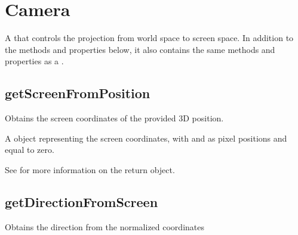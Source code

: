 \documentclass[letterpaper,12pt,english,openany,oneside]{sphinxmanual}
\begin{document}
\label{\detokenize{JS_3D_API:properties-2}}


\section{Camera}
\label{\detokenize{JS_3D_API:camera}}
A  that controls the projection from world space to screen space. In addition to the methods and properties below, it also contains the same methods and properties as a .

\label{\detokenize{JS_3D_API:properties-3}}


\subsection{getScreenFromPosition}
\label{\detokenize{JS_3D_API:getscreenfromposition}}
Obtains the screen coordinates of the provided 3D position.

\label{\detokenize{JS_3D_API:syntax-4}}

\begin{sphinxVerbatim}[commandchars=\\\{\}]
  
\end{sphinxVerbatim}
\label{\detokenize{JS_3D_API:parameters-2}}

\label{\detokenize{JS_3D_API:section-7}}\label{\detokenize{JS_3D_API:returns-4}}

A  object representing the screen coordinates, with  and  as pixel positions and  equal to zero.

See  for more information on the return object.


\subsection{getDirectionFromScreen}
\label{\detokenize{JS_3D_API:getdirectionfromscreen}}
Obtains the direction from the normalized coordinates
\end{document}
